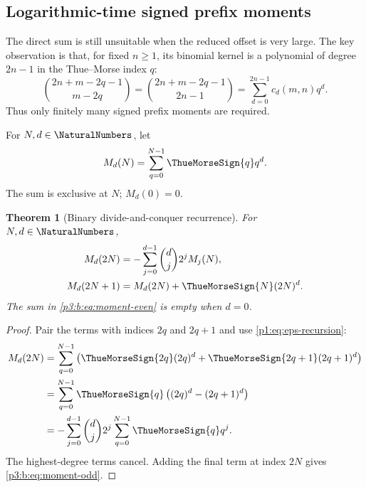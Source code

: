 \documentclass[11pt,oneside]{article}
\numberwithin{equation}{section}
\newtheorem{theorem}{Theorem}[section]
\theoremstyle{definition}
\theoremstyle{remark}
\begin{document}
\subsection{Logarithmic-time signed prefix moments}

The direct sum is still unsuitable when the reduced offset is very large.
The key observation is that, for fixed $n\ge1$, its binomial kernel is a
polynomial of degree $2n-1$ in the Thue--Morse index $q$:
\begin{equation}
 \binom{2n+m-2q-1}{m-2q}
 =\binom{2n+m-2q-1}{2n-1}
 =\sum_{d=0}^{2n-1}c_d(m,n)q^d.
 \label{p3:b:eq:kernel-polynomial}
\end{equation}
Thus only finitely many signed prefix moments are required.

\begin{definition}
For $N,d\in\NaturalNumbers$, let
\begin{equation}
 M_d(N)=\sum_{q=0}^{N-1}\ThueMorseSign{q}q^d.
 \label{p3:b:eq:prefix-moment}
\end{equation}
The sum is exclusive at $N$; $M_d(0)=0$.
\end{definition}

\begin{theorem}[Binary divide-and-conquer recurrence]
\label{p3:b:thm:moment-recurrence}
For $N,d\in\NaturalNumbers$,
\begin{align}
 M_d(2N)
 &=-\sum_{j=0}^{d-1}\binom dj2^jM_j(N),
 \label{p3:b:eq:moment-even}\\
 M_d(2N+1)
 &=M_d(2N)+\ThueMorseSign{N}(2N)^d.
 \label{p3:b:eq:moment-odd}
\end{align}
The sum in \eqref{p3:b:eq:moment-even} is empty when $d=0$.
\end{theorem}

\begin{proof}
Pair the terms with indices $2q$ and $2q+1$ and use
\eqref{p1:eq:eps-recursion}:
\begin{align*}
 M_d(2N)
 &=\sum_{q=0}^{N-1}
   \left(\ThueMorseSign{2q}(2q)^d+\ThueMorseSign{2q+1}(2q+1)^d\right)\\
 &=\sum_{q=0}^{N-1}\ThueMorseSign{q}\left((2q)^d-(2q+1)^d\right)\\
 &=-\sum_{j=0}^{d-1}\binom dj2^j
     \sum_{q=0}^{N-1}\ThueMorseSign{q}q^j.
\end{align*}
The highest-degree terms cancel.  Adding the final term at index $2N$ gives
\eqref{p3:b:eq:moment-odd}.
\end{proof}
\end{document}
